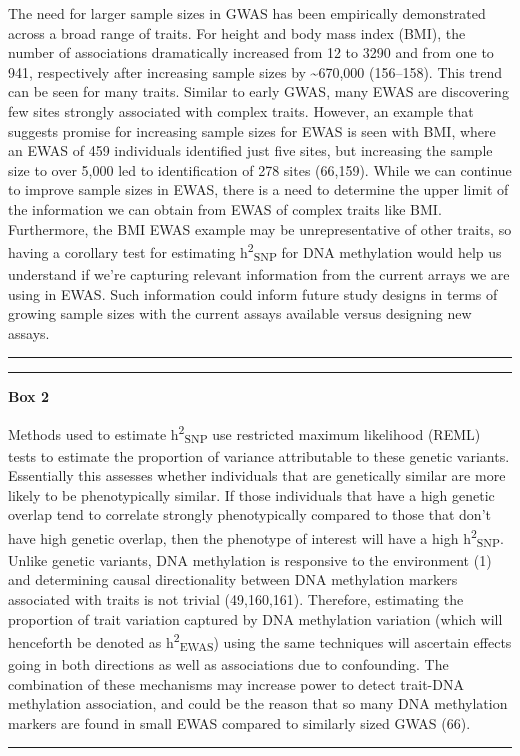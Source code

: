 \documentclass[11pt,oneside]{bristolthesis}
\begin{document}
The need for larger sample sizes in GWAS has been empirically demonstrated across a broad range of traits. For height and body mass index (BMI), the number of associations dramatically increased from 12 to 3290 and from one to 941, respectively after increasing sample sizes by \textasciitilde670,000 (156--158). This trend can be seen for many traits. Similar to early GWAS, many EWAS are discovering few sites strongly associated with complex traits. However, an example that suggests promise for increasing sample sizes for EWAS is seen with BMI, where an EWAS of 459 individuals identified just five sites, but increasing the sample size to over 5,000 led to identification of 278 sites (66,159). While we can continue to improve sample sizes in EWAS, there is a need to determine the upper limit of the information we can obtain from EWAS of complex traits like BMI. Furthermore, the BMI EWAS example may be unrepresentative of other traits, so having a corollary test for estimating h\textsuperscript{2}\textsubscript{SNP} for DNA methylation would help us understand if we're capturing relevant information from the current arrays we are using in EWAS. Such information could inform future study designs in terms of growing sample sizes with the current assays available versus designing new assays.
\begin{center}\rule{0.5\linewidth}{0.5pt}\end{center}
\begin{center}\rule{0.5\linewidth}{0.5pt}\end{center}

\textbf{Box 2}

Methods used to estimate h\textsuperscript{2}\textsubscript{SNP} use restricted maximum likelihood (REML) tests to estimate the proportion of variance attributable to these genetic variants. Essentially this assesses whether individuals that are genetically similar are more likely to be phenotypically similar. If those individuals that have a high genetic overlap tend to correlate strongly phenotypically compared to those that don't have high genetic overlap, then the phenotype of interest will have a high h\textsuperscript{2}\textsubscript{SNP}. Unlike genetic variants, DNA methylation is responsive to the environment (1) and determining causal directionality between DNA methylation markers associated with traits is not trivial (49,160,161). Therefore, estimating the proportion of trait variation captured by DNA methylation variation (which will henceforth be denoted as h\textsuperscript{2}\textsubscript{EWAS}) using the same techniques will ascertain effects going in both directions as well as associations due to confounding. The combination of these mechanisms may increase power to detect trait-DNA methylation association, and could be the reason that so many DNA methylation markers are found in small EWAS compared to similarly sized GWAS (66).
\begin{center}\rule{0.5\linewidth}{0.5pt}\end{center}
\end{document}
